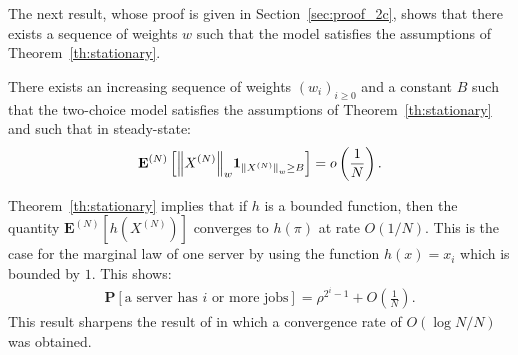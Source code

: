 \documentclass[sigconf]{acmart}
\newcommand\XN{X^{(N)}}
\newcommand\espN[1]{{\mathchoice{\bespN{#1}}{\sespN{#1}}{\sespN{#1}}{\sespN{#1}}}}
\newcommand\bespN[1]{\mathbf{E}^{(N)}\left[#1\right]}
\newcommand\sespN[1]{\mathbf{E}^{(N)}[#1]}
\newcommand\Proba[1]{\mathbf{P}\left[#1\right]}
\newcommand\norm[1]{{\mathchoice{\bnorm{#1}}{\snorm{#1}}{\snorm{#1}}{\snorm{#1}}}}
\newcommand\bnorm[1]{\left\|#1\right\|}
\newcommand\snorm[1]{\|#1\|}
\newcommand\p[1]{\left(#1\right)}
\begin{document}
The next result, whose proof is given in Section~\ref{sec:proof_2c},
shows that there exists a sequence of weights $w$ such that the model
satisfies the assumptions of
Theorem~\ref{th:stationary}. 
\begin{theorem}
  \label{th:two-choice}
  There exists an increasing sequence of weights $(w_i)_{i\ge0}$ and a
  constant $B$ such that the two-choice model satisfies the
  assumptions of Theorem~\ref{th:stationary} and such that in
  steady-state:
  \begin{align}
    \label{eq:bound_2c}
    \espN{\norm{\XN}_w\mathbf{1}_{\norm{\XN}_w\ge B}}=o\p{\frac1{N}}.
  \end{align}
\end{theorem}

Theorem~\ref{th:stationary} implies that if $h$ is a bounded function,
then the quantity $\sespN{h(\XN)}$ converges to $h(\pi)$ at rate
$O(1/N)$. This is the case for the marginal law of one server by using
the function $h(x)=x_i$ which is bounded by $1$. This shows:
\begin{align*}
  \Proba{\text{a server has $i$ or more jobs}} = \rho^{2^i-1} +
  O\p{\frac1N}. 
\end{align*}
This result sharpens the result of \cite{luczak2007asymptotic} in
which a convergence rate of $O(\log N/N)$ was obtained. 
\end{document}
